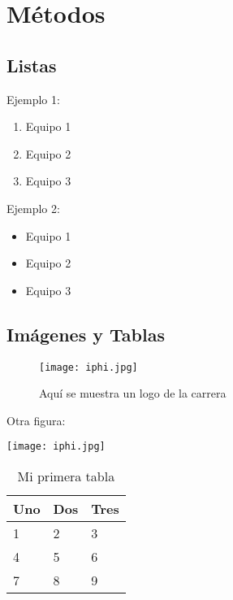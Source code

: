 \documentclass{article}
\begin{document}
\newpage
\section{Métodos}

\subsection{Listas}

Ejemplo 1:
\begin{enumerate}
\item Equipo 1
\item Equipo 2
\item Equipo 3
\end{enumerate}

\noindent Ejemplo 2:
\begin{itemize}
    \item Equipo 1
    \item Equipo 2
    \item Equipo 3
\end{itemize}



\newpage
\subsection{Imágenes y Tablas}

\begin{figure}
\begin{center}
    \texttt{[image: iphi.jpg]}
    \end{center}
    \caption{Aqu\'{i} se muestra un logo de la carrera}
    \label{fig:Logo}
\end{figure}

Otra figura:
\newenvironment{Figure}
  {\par\medskip\noindent\minipage{\linewidth}}
  {\endminipage\par\medskip}
\begin{Figure}
    \centering
    \texttt{[image: iphi.jpg]}
\end{Figure}


\begin{table}[h]
\begin{center}
\begin{tabular}{lll}
\toprule
Uno & Dos & Tres \\
\midrule
1 & 2 & 3 \\
4 & 5 & 6 \\
7 & 8 & 9
\end{tabular}
\end{center}
\caption{Mi primera tabla}
\end{table}
\end{document}
